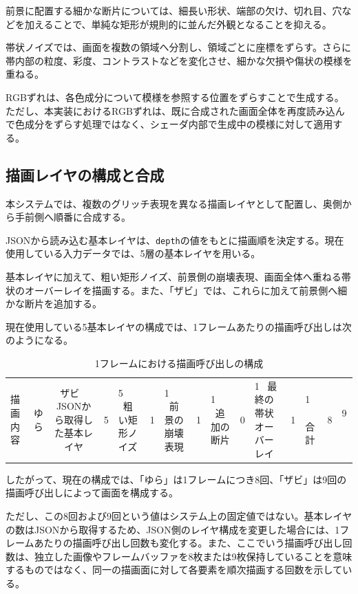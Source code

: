前景に配置する細かな断片については、細長い形状、端部の欠け、切れ目、穴などを加えることで、単純な矩形が規則的に並んだ外観となることを抑える。

帯状ノイズでは、画面を複数の領域へ分割し、領域ごとに座標をずらす。さらに帯内部の粒度、彩度、コントラストなどを変化させ、細かな欠損や傷状の模様を重ねる。

RGBずれは、各色成分について模様を参照する位置をずらすことで生成する。ただし、本実装におけるRGBずれは、既に合成された画面全体を再度読み込んで色成分をずらす処理ではなく、シェーダ内部で生成中の模様に対して適用する。

\subsection{描画レイヤの構成と合成}

本システムでは、複数のグリッチ表現を異なる描画レイヤとして配置し、奥側から手前側へ順番に合成する。

JSONから読み込む基本レイヤは、\texttt{depth}の値をもとに描画順を決定する。現在使用している入力データでは、5層の基本レイヤを用いる。

基本レイヤに加えて、粗い矩形ノイズ、前景側の崩壊表現、画面全体へ重ねる帯状のオーバーレイを描画する。また、「ザビ」では、これらに加えて前景側へ細かな断片を追加する。

現在使用している5基本レイヤの構成では、1フレームあたりの描画呼び出しは次のようになる。

\begin{table}[htbp]
\centering
\caption{1フレームにおける描画呼び出しの構成}
\begin{tabular}{lcc}
\hline
描画内容 & ゆら & ザビ \
\hline
JSONから取得した基本レイヤ & 5 & 5 \
粗い矩形ノイズ & 1 & 1 \
前景の崩壊表現 & 1 & 1 \
追加の断片 & 0 & 1 \
最終の帯状オーバーレイ & 1 & 1 \
\hline
合計 & 8 & 9 \
\hline
\end{tabular}
\end{table}

したがって、現在の構成では、「ゆら」は1フレームにつき8回、「ザビ」は9回の描画呼び出しによって画面を構成する。

ただし、この8回および9回という値はシステム上の固定値ではない。基本レイヤの数はJSONから取得するため、JSON側のレイヤ構成を変更した場合には、1フレームあたりの描画呼び出し回数も変化する。また、ここでいう描画呼び出し回数は、独立した画像やフレームバッファを8枚または9枚保持していることを意味するものではなく、同一の描画面に対して各要素を順次描画する回数を示している。

